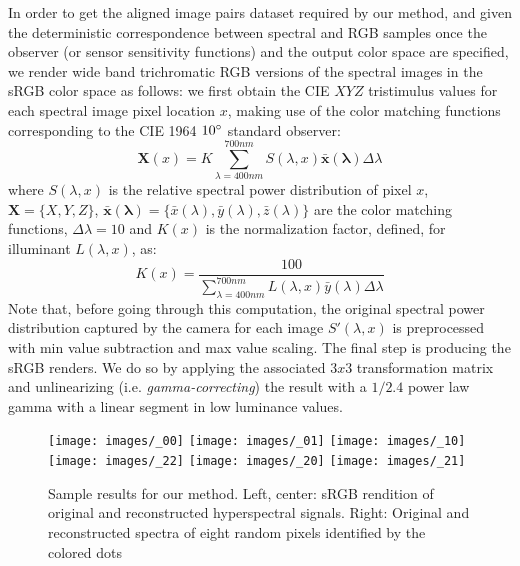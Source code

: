 \documentclass{bmvc2k}
\begin{document}
In order to get the aligned image pairs dataset required by our method, and given the deterministic correspondence between spectral and RGB samples once the observer (or sensor sensitivity functions) and the output color space are specified, we render wide band trichromatic RGB versions of the spectral images in the sRGB color space as follows: we first obtain the CIE $XYZ$ tristimulus values for each spectral image pixel location $x$, making use of the color matching functions corresponding to the CIE 1964 $10\degree$ standard observer:
\begin{equation} \label{eq:trix}
\mathbf{X}(x)=K\sum_{\lambda=400nm}^{700nm}S(\lambda, x)\mathbf{\bar{x}(\lambda)}\Delta\lambda
\end{equation}
where $S(\lambda, x)$ is the relative spectral power distribution of pixel $x$, $\mathbf{X}=\{X,Y,Z\}$, $\mathbf{\bar{x}(\lambda)}=\{\bar{x}(\lambda), \bar{y}(\lambda), \bar{z}(\lambda)\}$ are the color matching functions, $\Delta\lambda=10$ and $K(x)$ is the normalization factor, defined, for illuminant $L(\lambda, x)$, as:
\begin{equation} \label{eq:trik}
K(x)=\frac{100}{\sum_{\lambda=400nm}^{700nm}L(\lambda, x)\bar{y}(\lambda)\Delta\lambda}
\end{equation}
Note that, before going through this computation, the original spectral power distribution captured by the camera for each image $S'(\lambda, x)$ is preprocessed with min value subtraction and max value scaling.
The final step is producing the sRGB renders. We do so by applying the associated $3x3$ transformation matrix and unlinearizing (i.e. \emph{gamma-correcting}) the result with a $1/2.4$ power law gamma with a linear segment in low luminance values.
\begin{figure*}
	\begin{center}
        \texttt{[image: images/\_00]}
        \texttt{[image: images/\_01]}
        \texttt{[image: images/\_10]}
        \texttt{[image: images/\_22]}
        \texttt{[image: images/\_20]}
        \texttt{[image: images/\_21]}
	\end{center}
	\caption{Sample results for our method. Left, center: sRGB rendition of original and reconstructed hyperspectral signals. Right: Original and reconstructed spectra of eight random pixels identified by the colored dots}
	\label{fig:results}
\end{figure*}
\end{document}
